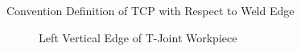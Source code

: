 \begin{figure}[!htbp]
\begin{subfigure}[b]{0.4\textwidth}
		\caption{} 
		\label{fig:imgoridef2}
	\end{subfigure}	
	\caption{Convention Definition of TCP with Respect  to Weld Edge}  
	\label{fig:tcor}
\end{figure}

\begin{figure}[!htbp] %
	\centering
	\begin{subfigure}[b]{0.4\textwidth}	
		 \caption{Left Vertical Edge of T-Joint Workpiece}
	\end{subfigure}
	\begin{subfigure}[b]{0.4\textwidth}		

\end{subfigure}
\end{figure}
